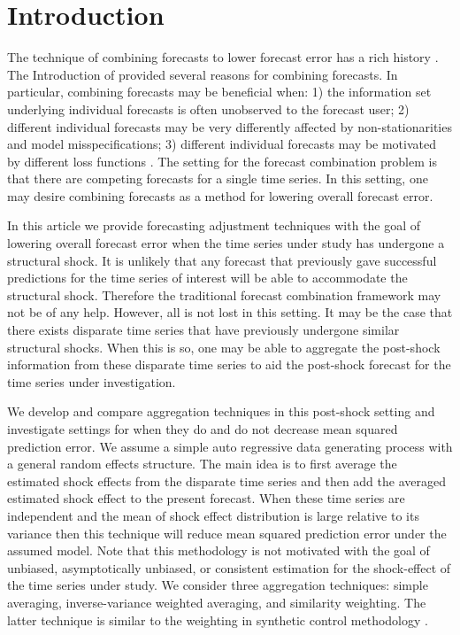 \documentclass[11pt]{article}
\theoremstyle{definition}
\begin{document}
\section{Introduction}
The technique of combining forecasts to lower forecast error has a rich 
history \citep{bates1969combination, mundlak1978pooling, 
  timmermann2006forecast, granger2014forecasting}.  
The Introduction of \citet{timmermann2006forecast} provided several reasons 
for combining forecasts.  In particular, combining forecasts may be 
beneficial when: 
1) the information set underlying individual forecasts is often unobserved to 
the forecast user; 2) different individual forecasts may be very differently 
affected by non-stationarities and model misspecifications; 3) different 
individual forecasts may be motivated by different loss functions 
\citep[and references therein]{timmermann2006forecast}.
The setting for the forecast combination problem is that there are 
competing forecasts for a single time series.  In this setting, one may 
desire combining forecasts as a method for lowering overall forecast error.  




In this article we provide forecasting adjustment techniques with the goal 
of lowering overall forecast error when the time series under study has 
undergone a structural shock.
It is unlikely that any forecast that previously gave successful predictions 
for the time series of interest will be able to accommodate the 
structural shock.  Therefore the traditional forecast combination framework 
may not be of any help. However, all is not lost in this setting. It may be 
the case that there exists disparate time series that have previously 
undergone similar structural shocks.  When this is so, one may be able to 
aggregate the post-shock information from these disparate time series to 
aid the post-shock forecast for the time series under investigation.  

We develop and compare aggregation techniques in this post-shock setting and 
investigate settings for when they do and do not decrease mean squared 
prediction error. We assume a simple auto regressive data generating process 
with a general random effects structure. The main idea is to first average 
the estimated shock effects from the disparate time series and then add 
the averaged estimated shock effect to the present forecast. When these 
time series are independent and the mean of shock effect distribution is 
large relative to its variance then this technique will reduce mean squared 
prediction error under the assumed model. Note that this methodology is not 
motivated with the goal of unbiased, asymptotically unbiased, or consistent 
estimation for the shock-effect of the time series under study. We consider 
three aggregation techniques: simple averaging, inverse-variance weighted 
averaging, and similarity weighting. The latter technique is similar to 
the weighting in synthetic control methodology \citep{abadie2010synthetic}.
\end{document}

